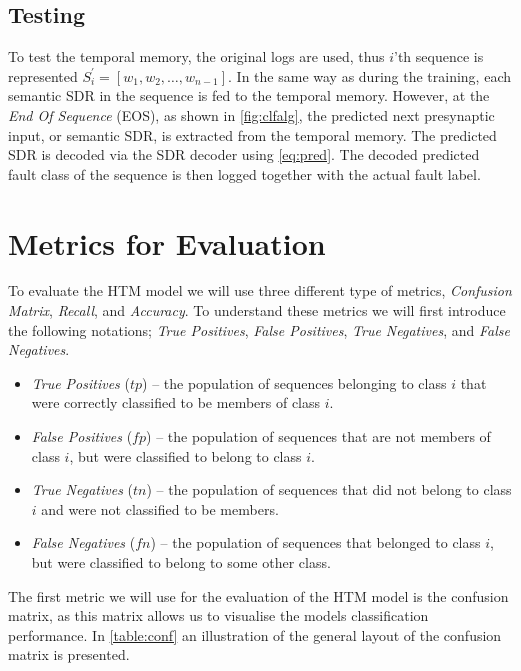 \subsection{Testing}
To test the temporal memory, the original logs are used, thus $i$'th sequence is represented $S_i^{\prime} = [w_1, w_2, \hdots, w_{n-1}]$. In the same way as during the training, each semantic SDR in the sequence is fed to the temporal memory. However, at the \textit{End Of Sequence} (EOS), as shown in \autoref{fig:clfalg}, the predicted next presynaptic input, or semantic SDR, is extracted from the temporal memory. The predicted SDR is decoded via the SDR decoder using \autoref{eq:pred}. The decoded predicted fault class of the sequence is then logged together with the actual fault label.  


\section{Metrics for Evaluation}
\label{sec:metrics}
To evaluate the HTM model we will use three different type of metrics, \textit{Confusion Matrix}, \textit{Recall}, and \textit{Accuracy}. To understand these metrics we will first introduce the following notations; \textit{True Positives}, \textit{False Positives}, \textit{True Negatives}, and \textit{False Negatives}.

\begin{itemize}
    \item \textit{True Positives} ($tp$) -- the population of sequences belonging to class $i$ that were correctly classified to be members of class $i$.
    
    \item \textit{False Positives} ($fp$) -- the population of sequences that are not members of class $i$, but were classified to belong to class $i$.
    
    \item \textit{True Negatives} ($tn$) -- the population of sequences that did not belong to class $i$ and were not classified to be members.
    
    \item \textit{False Negatives} ($fn$) -- the population of sequences that belonged to class $i$, but were classified to belong to some other class.
    
\end{itemize}



The first metric we will use for the evaluation of the HTM model is the confusion matrix, as this matrix allows us to visualise the models classification performance. In \autoref{table:conf} an illustration of the general layout of the confusion matrix is presented. 

